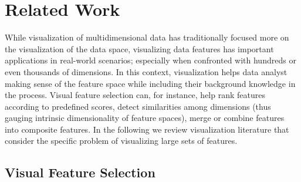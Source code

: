 
\section{Related Work}
While visualization of multidimensional data has traditionally focused
more on the visualization of the data space, visualizing data features
has important applications in real-world scenarios;
especially when confronted with hundreds or even thousands of dimensions.
In this context, visualization helps data analyst making sense of the
feature space while including their background knowledge in the process.
Visual feature selection can, for instance, help rank features according
to predefined scores, detect similarities among dimensions
(thus gauging intrinsic dimensionality of feature spaces),
merge or combine features into composite features.
In the following we review visualization literature that consider
the specific problem of visualizing large sets of features.

\subsection{Visual Feature Selection}

